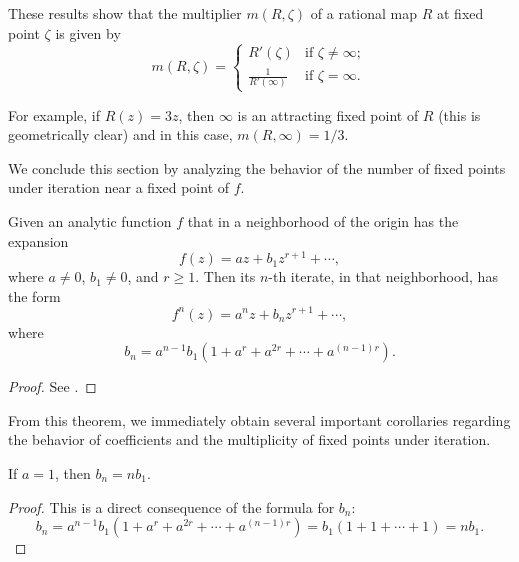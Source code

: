 \begin{remark}
    These results show that the multiplier $m(R, \zeta)$ of a rational map $R$
    at fixed point $\zeta$ is given by
    \begin{equation*}
        m(R, \zeta) =
        \begin{cases}
            R'(\zeta) & \text{if } \zeta \neq \infty; \\
            \frac{1}{R'(\infty)} & \text{if } \zeta = \infty.
        \end{cases}
    \end{equation*}
\end{remark}

\begin{example}
    For example, if $R(z) = 3z$, then $\infty$ is an attracting fixed point of
    $R$ (this is geometrically clear) and in this case, $m(R, \infty) = 1/3$.
\end{example}

We conclude this section by analyzing the behavior of the number of fixed points
under iteration near a fixed point of $f$.

\begin{theorem}
    Given an analytic function $f$ that in a neighborhood of the origin has the
    expansion
    \begin{equation*}
        f(z) = a z + b_1 z^{r+1} + \cdots,
    \end{equation*}
    where $a \neq 0$, $b_1 \neq 0$, and $r \geq 1$. Then its $n$-th iterate, in
    that neighborhood, has the form
    \begin{equation*}
        f^n(z) = a^n z + b_n z^{r+1} + \cdots,
    \end{equation*}
    where
    \begin{equation*}
        b_n = a^{n-1} b_1 \left( 1 + a^r + a^{2r} + \cdots + a^{(n-1)r} \right).
    \end{equation*}
\end{theorem}
\begin{proof}
    See \cite[42]{Beardon1991}.
\end{proof}

From this theorem, we immediately obtain several important corollaries regarding
the behavior of coefficients and the multiplicity of fixed points under
iteration.

\begin{corollary}[$a = 1 \implies b_n = n b_1$]
    \label{cor:a_equals_1_implies_bn_equals_nb1}
    If $a = 1$, then $b_n = n b_1$.
\end{corollary}
\begin{proof}
    This is a direct consequence of the formula for $b_n$:
    \begin{equation*}
        b_n = a^{n-1} b_1 \left( 1 + a^r + a^{2r} + \cdots + a^{(n-1)r} \right) = b_1 (1 + 1 + \cdots + 1) = n b_1.
    \end{equation*}
\end{proof}

